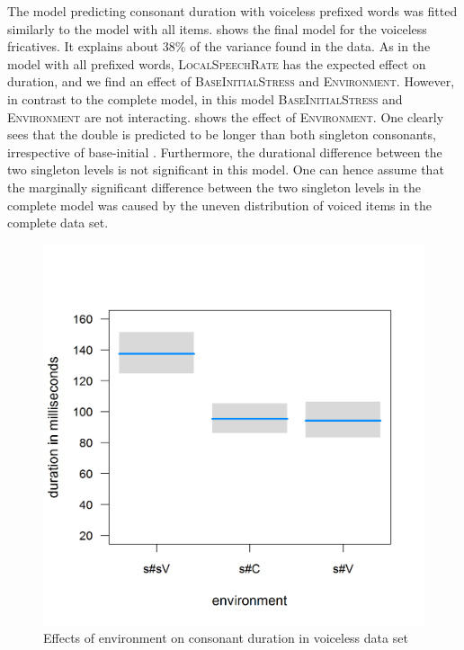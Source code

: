 The model predicting consonant duration with voiceless prefixed words was fitted similarly to the model with all items. 
 shows the final model for the voiceless fricatives. It explains about 38\% of the variance found in the data. 
As in the model with all prefixed words, \textsc{LocalSpeechRate} has the expected effect on duration, and we find an effect of \textsc{BaseInitialStress} and \textsc{Environment}. However, in contrast to the complete model, in this model \textsc{BaseInitialStress} and \textsc{Environment} are not interacting. 
 shows the effect of  \textsc{Environment}. One clearly sees that the double is predicted to be longer than both singleton consonants, irrespective of base-initial . Furthermore, the durational difference between the two singleton levels is not significant in this model. One can hence assume that the marginally significant difference between the two singleton levels in the complete model was caused by the uneven distribution of voiced items in the complete data set. 


\begin{figure}
	
	\includegraphics [scale=0.4]{images/Corpus/disModelWithoutVoicedSoundsEnvironment.png}
	\caption{ Effects of environment on consonant duration in voiceless data set}
	\label{fig:corpus main effect 1 dis without voiced items} 
\end{figure}


